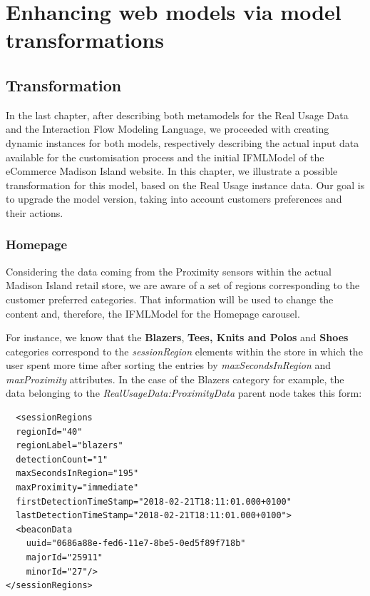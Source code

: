 \chead{}

\chapter{Enhancing web models via model transformations}
\label{enhancing-web-models-via-model-transformations}

\section{Transformation}

In the last chapter, after describing both metamodels for the Real Usage Data and the Interaction Flow Modeling Language, we proceeded with creating dynamic instances for both models, respectively describing the actual input data available for the customisation process and the initial IFMLModel of the eCommerce Madison Island website. In this chapter, we illustrate a possible transformation for this model, based on the Real Usage instance data. Our goal is to upgrade the model version, taking into account customers preferences and their actions.

\subsection{Homepage}
\label{homepage-updates}
Considering the data coming from the Proximity sensors within the actual Madison Island retail store, we are aware of a set of regions corresponding to the customer preferred categories. That information will be used to change the content and, therefore, the IFMLModel for the Homepage carousel.

For instance, we know that the \textbf{Blazers}, \textbf{Tees, Knits and Polos} and \textbf{Shoes} categories correspond to the \textit{sessionRegion} elements within the store in which the user spent more time after sorting the entries by \textit{maxSecondsInRegion} and \textit{maxProximity} attributes. In the case of the Blazers category for example, the data belonging to the \textit{RealUsageData:ProximityData} parent node takes this form:

\vspace{0.5cm}
\lstset{language=XML}
\begin{lstlisting} 
  <sessionRegions
  regionId="40"
  regionLabel="blazers"
  detectionCount="1"
  maxSecondsInRegion="195"
  maxProximity="immediate"
  firstDetectionTimeStamp="2018-02-21T18:11:01.000+0100"
  lastDetectionTimeStamp="2018-02-21T18:11:01.000+0100">
  <beaconData
    uuid="0686a88e-fed6-11e7-8be5-0ed5f89f718b"
    majorId="25911"
    minorId="27"/>
</sessionRegions>
\end{lstlisting}
\vspace{0.5cm}

